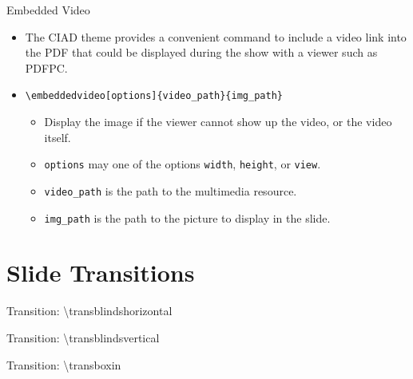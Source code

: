 \documentclass[english,sectioncirclenumberstyle]{ciadbeamer}
\begin{document}
\begin{frame}{Embedded Video}
	\begin{itemize}
	\item The CIAD theme provides a convenient command to include a video link into the PDF that could be displayed during the show with a viewer such as PDFPC.
	\item \texttt{{\textbackslash}embeddedvideo[options]\{video\_path\}\{img\_path\}}
		\begin{itemize}
		\item Display the image if the viewer cannot show up the video, or the video itself.
		\item \texttt{options} may one of the options \texttt{width}, \texttt{height}, or \texttt{view}.
		\item \texttt{video\_path} is the path to the multimedia resource.
		\item \texttt{img\_path} is the path to the picture to display in the slide.
		\end{itemize}
	\end{itemize}
\end{frame}

\section{Slide Transitions}
\sectiontableofcontentslide


\begin{frame}[c]{Transition: {\textbackslash}transblindshorizontal}
	\transblindshorizontal
	\begin{center}
	\end{center}
\end{frame}

\begin{frame}[c]{Transition: {\textbackslash}transblindsvertical}
	\transblindsvertical
	\begin{center}
	\end{center}
\end{frame}

\begin{frame}[c]{Transition: {\textbackslash}transboxin}
	\transboxin
	\begin{center}
	\end{center}
\end{frame}
\end{document}
